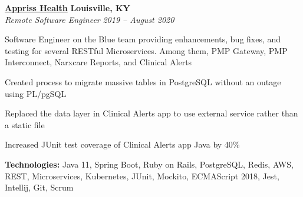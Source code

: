 %
    \headerrow
        {\textbf{\href{https://apprisshealth.com/}{Appriss Health}}}
        {\textbf{Louisville, KY}}
    \\
    \headerrow
        {\emph{Remote Software Engineer}}
        {\emph{2019 -- August 2020}}
    \begin{itemize*}
        \item Software Engineer on the Blue team providing enhancements, bug fixes, and testing for several RESTful Microservices.
            Among them, PMP Gateway, PMP Interconnect, Narxcare Reports, and Clinical Alerts
        \item Created process to migrate massive tables in PostgreSQL without an outage using PL/pgSQL
        \item Replaced the data layer in Clinical Alerts app to use external service rather than a static file
        \item Increased JUnit test coverage of Clinical Alerts app Java by 40\%
    \end{itemize*}

    \hspace{1.0em}
        {\textbf{Technologies:} Java 11, Spring Boot, Ruby on Rails, PostgreSQL, Redis, AWS,
        REST, Microservices, Kubernetes, JUnit, Mockito, ECMAScript 2018, Jest, Intellij, Git, Scrum}

